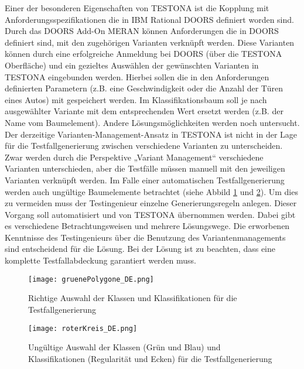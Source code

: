 Einer der besonderen Eigenschaften von TESTONA ist die Kopplung mit Anforderungsspezifikationen die in IBM Rational DOORS definiert worden sind. Durch das DOORS Add-On MERAN können Anforderungen die in DOORS definiert sind, mit den zugehörigen Varianten verknüpft werden. Diese Varianten können durch eine erfolgreiche Anmeldung bei DOORS (über die TESTONA Oberfläche) und ein gezieltes Auswählen der gewünschten Varianten in TESTONA eingebunden werden. Hierbei sollen die in den Anforderungen definierten Parametern (z.B. eine Geschwindigkeit oder die Anzahl der Türen eines Autos) mit gespeichert werden. Im Klassifikationsbaum soll je nach ausgewählter Variante mit dem entsprechenden Wert ersetzt werden (z.B. der Name vom Baumelement). Andere Lösungsmöglichkeiten werden noch untersucht.\\

Der derzeitige Varianten-Management-Ansatz in TESTONA ist nicht in der Lage für die Testfallgenerierung zwischen verschiedene Varianten zu unterscheiden. Zwar werden durch die Perspektive „Variant Management“ verschiedene Varianten unterschieden, aber die Testfälle müssen manuell mit den jeweiligen Varianten verknüpft werden. Im Falle einer automatischen Testfallgenerierung werden auch ungültige Baumelemente betrachtet (siehe Abbild \ref{ttn.gruen} und \ref{ttn.rot}). Um dies zu vermeiden muss der Testingenieur einzelne Generierungsregeln anlegen. Dieser Vorgang soll automatisiert und von TESTONA übernommen werden. Dabei gibt es verschiedene Betrachtungsweisen und mehrere Lösungswege. Die erworbenen Kenntnisse des Testingenieurs über die Benutzung des Variantenmanagements sind entscheidend für die Lösung. Bei der Lösung ist zu beachten, dass eine komplette Testfallabdeckung garantiert werden muss.\\


\begin{figure}[h]
  \begin{center}
    \texttt{[image: gruenePolygone\_DE.png]}
  		  \caption{Richtige Auswahl der Klassen und Klassifikationen für die Testfallgenerierung}
     \label{ttn.gruen}
  \end{center}
\end{figure}


\begin{figure}[h]
  \begin{center}
    \texttt{[image: roterKreis\_DE.png]}
  		  \caption{Ungültige Auswahl der Klassen (Grün und Blau) und Klassifikationen (Regularität und Ecken) für die Testfallgenerierung}
     \label{ttn.rot}
  \end{center}
\end{figure}


